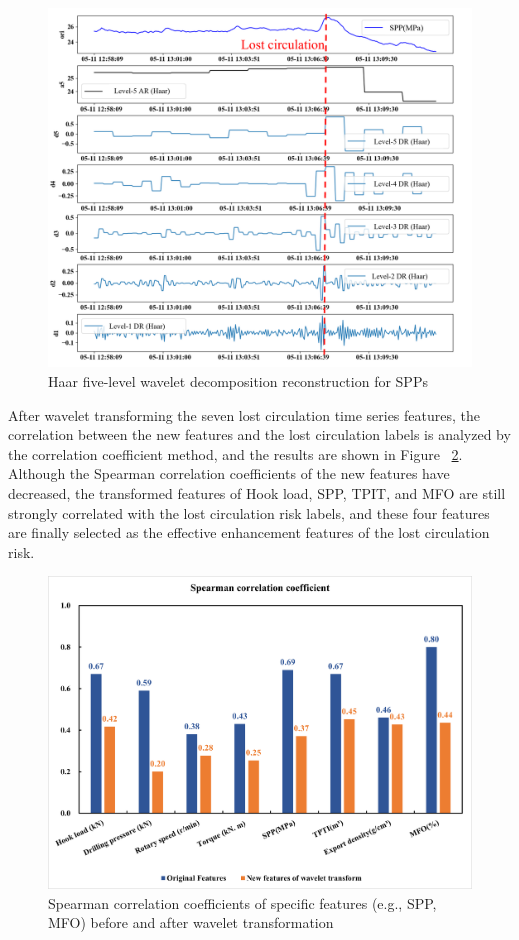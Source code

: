 \documentclass[journal,article,submit,pdftex,moreauthors]{Definitions/mdpi}
\begin{document}
\begin{figure}[H]
    \centering
    \includegraphics[width=0.85\linewidth]{图片/5级小波分解.png}
    \caption{Haar five-level wavelet decomposition reconstruction for SPPs}
    \label{fig:Haar five-level wavelet decomposition reconstruction for SPPs}
\end{figure}

After wavelet transforming the seven lost circulation time series features, the correlation between the new features and the lost circulation labels is analyzed by the correlation coefficient method, and the results are shown in Figure  \ref{fig:Spearman correlation coefficients of features before and after wavelet transformation}. Although the Spearman correlation coefficients of the new features have decreased, the transformed features of Hook load, SPP, TPIT, and MFO are still strongly correlated with the lost circulation risk labels, and these four features are finally selected as the effective enhancement features of the lost circulation risk.

\begin{figure}[H]
    \centering
    \includegraphics[width=0.85\linewidth]{图片/spearman相关系数.png}
    \caption{Spearman correlation coefficients of specific features (e.g., SPP, MFO) before and after wavelet transformation}
    \label{fig:Spearman correlation coefficients of features before and after wavelet transformation}
\end{figure}
\end{document}
